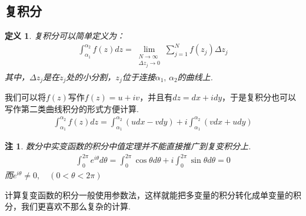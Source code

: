 \documentclass[12pt, a4paper]{ctexbook}
\newtheorem{definition}{定义}[chapter] %
\newtheorem{remark}{注}[chapter] %
\begin{document}
            \subsection{复积分}
                \begin{definition}
                    \label{the:complex_integral}
                    复积分可以简单定义为：
                    \begin{align*}
                        \int_{\alpha_1}^{\alpha_2}f(z)dz 
                        = \lim_{\substack{N \to \infty \\
                        \varDelta z_j \to 0}}
                        \sum_{j = 1}^{N}f(z_j)\varDelta z_j
                    \end{align*}
                    其中，$\varDelta z_j$是在$z_j$处的小分割，$z_j$位于连接$\alpha_1, \, \alpha_2$的曲线上.
                \end{definition}

                我们可以将$f(z)$写作$f(z) = u + iv$，并且有$dz = dx + idy$，于是复积分也可以写作第二类曲线积分的形式方便计算.
                \begin{align}
                    \int_{\alpha_1}^{\alpha_2}f(z)dz = \int_{\alpha_1}^{\alpha_2}(udx - vdy) + i \int_{\alpha_1}^{\alpha_2}(vdx + udy)
                \end{align}

                \begin{remark}
                    数分中实变函数的积分中值定理并不能直接推广到复变积分上.
                    \begin{align*}
                        \int_{0}^{2\pi}e^{i\theta}d\theta = \int_{0}^{2\pi}\cos{\theta}d\theta + i \int_{0}^{2\pi}\sin{\theta}d\theta = 0
                    \end{align*}
                    而$e^{i\theta} \neq 0, \quad (0 < \theta < 2\pi)$
                \end{remark}

                计算复变函数的积分一般使用参数法，这样就能把多变量的积分转化成单变量的积分，我们更喜欢不那么复杂的计算.
\end{document}
